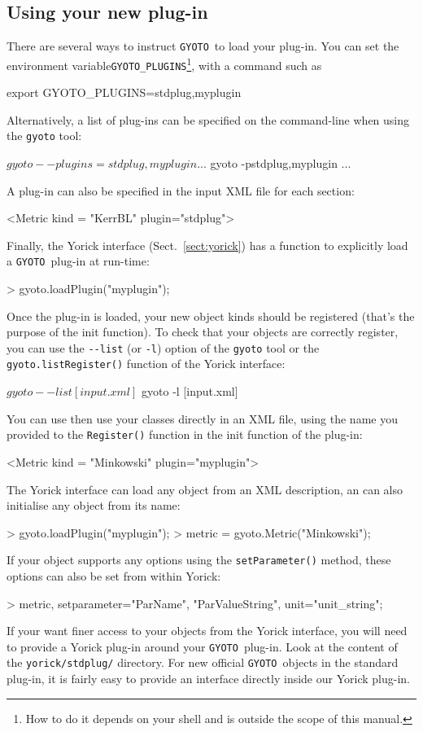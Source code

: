 \documentclass[a4paper,12pt]{article}
\newcommand{\GYOTO}{\texttt{GYOTO}}
\begin{document}
\subsection{Using your new plug-in}
There are several ways to instruct \GYOTO\ to load your plug-in. You
can set the environment variable\texttt{GYOTO\_PLUGINS}\footnote{How
  to do it depends on your shell and is outside the scope of this
  manual.}, with a command such as
\begin{code}
  export GYOTO_PLUGINS=stdplug,myplugin
\end{code}
Alternatively, a list of plug-ins can be specified on the command-line
when using the \texttt{gyoto} tool:
\begin{code}
  $ gyoto --plugins=stdplug,myplugin ...
  $ gyoto -pstdplug,myplugin ...
\end{code}
A plug-in can also be specified in the input XML file for each
section:
\begin{code}
   <Metric kind = "KerrBL" plugin="stdplug">
\end{code}
Finally, the Yorick interface (Sect.~\ref{sect:yorick}) has a function
to explicitly load a \GYOTO\ plug-in at run-time:
\begin{code}
 > gyoto.loadPlugin("myplugin");
\end{code}
Once the plug-in is loaded, your new object kinds should be registered
(that's the purpose of the init function). To check that your objects
are correctly register, you can use the \texttt{-{}-list} (or
\texttt{-l}) option of the \texttt{gyoto} tool or the
\texttt{gyoto.listRegister()} function of the Yorick interface:
\begin{code}
  $ gyoto --list [input.xml]
  $ gyoto -l [input.xml]
\end{code}

You can use then use your classes directly in an XML file, using the
name you provided to the \texttt{Register()} function in the init
function of the plug-in:
\begin{code}
   <Metric kind = "Minkowski" plugin="myplugin">
\end{code}
The Yorick interface can load any object from an XML description, an
can also initialise any object from its name:
\begin{code}
 > gyoto.loadPlugin("myplugin");
 > metric = gyoto.Metric("Minkowski");
\end{code}
If your object supports any options using the \texttt{setParameter()}
method, these options can also be set from within Yorick:
\begin{code}
 > metric, setparameter="ParName", "ParValueString", unit="unit_string";
\end{code}
If your want finer access to your objects from the Yorick interface,
you will need to provide a Yorick plug-in around your \GYOTO\
plug-in. Look at the content of the \texttt{yorick/stdplug/}
directory. For new official \GYOTO\ objects in the standard plug-in,
it is fairly easy to provide an interface directly inside our Yorick
plug-in.
\end{document}
